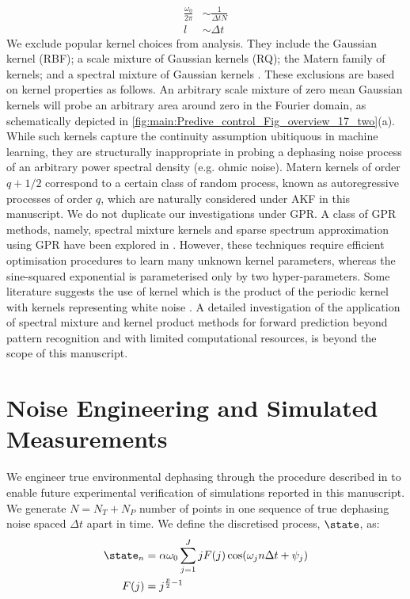 \begin{align}
\frac{\omega_0}{2\pi} & \sim  \frac{1}{\Delta t N} \\
l & \sim \Delta t
\end{align} 
We exclude popular kernel choices from analysis. They include the Gaussian kernel (RBF); a scale mixture of Gaussian kernels (RQ); the Matern family of kernels; and a spectral mixture of Gaussian kernels \cite{rasmussen2005gaussian, tobar2015learning}. These exclusions are based on kernel properties as follows. An arbitrary scale mixture of zero mean Gaussian kernels will probe an arbitrary area around zero in the Fourier domain, as schematically depicted in \cref{fig:main:Predive_control_Fig_overview_17_two}(a). While such kernels capture the continuity assumption ubitiquous in machine learning, they are structurally inappropriate in probing a dephasing noise process of an arbitrary power spectral density (e.g. ohmic noise).  Matern kernels of order $q + 1/2$ correspond to a certain class of random process, known as autoregressive processes of order $q$, which are naturally considered under AKF in this manuscript. We do not duplicate our investigations under GPR. A class of GPR methods, namely, spectral mixture kernels and sparse spectrum approximation using GPR have been explored in \cite{wilson2013, quia2010}. However, these techniques require efficient optimisation procedures to learn many unknown kernel parameters, whereas the sine-squared exponential is parameterised only by two hyper-parameters.  Some literature suggests the use of kernel which is the product of the periodic kernel with kernels representing white noise \cite{klenske2016gaussian}. A detailed investigation of the application of spectral mixture and kernel product methods for forward prediction beyond pattern recognition and with limited computational resources, is beyond the scope of this manuscript. 

\section{Noise Engineering and Simulated Measurements\label{sec:main:NoiseEngineering}}

We engineer true environmental dephasing through the procedure described in \cite{soare2014} to enable future experimental verification of simulations reported in this manuscript. We generate $ N = N_T + N_P$ number of points in one sequence of true dephasing noise spaced $\Delta t $ apart in time. We define the discretised process, $\state$, as:
\begin{align}
\state_n &= \alpha \omega_0 \sum_{j=1}^{J} j F(j)\cos(\omega_j n \Delta t + \psi_j) \\
F(j) & = j^{\frac{p}{2}-1} 
\end{align}

